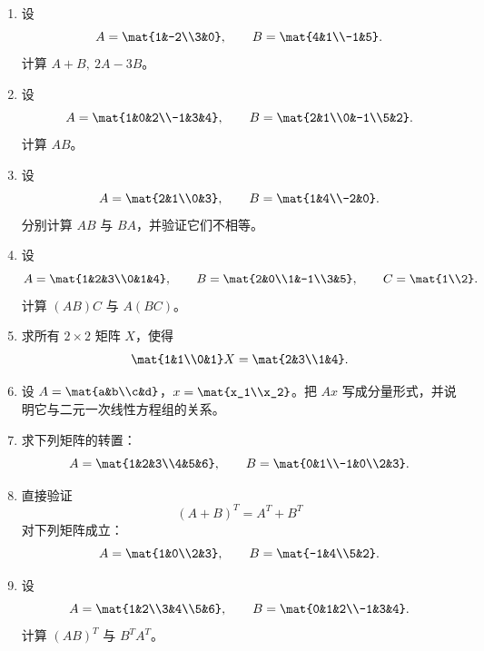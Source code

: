 \begin{enumerate}[label=\arabic*.]
  \item \basic 设
  \[
  A=\mat{1&-2\\3&0},\qquad B=\mat{4&1\\-1&5}.
  \]
  计算 $A+B,\ 2A-3B$。

  \item \basic 设
  \[
  A=\mat{1&0&2\\-1&3&4},\qquad B=\mat{2&1\\0&-1\\5&2}.
  \]
  计算 $AB$。

  \item \basic 设
  \[
  A=\mat{2&1\\0&3},\qquad B=\mat{1&4\\-2&0}.
  \]
  分别计算 $AB$ 与 $BA$，并验证它们不相等。

  \item \basic 设
  \[
  A=\mat{1&2&3\\0&1&4},\qquad B=\mat{2&0\\1&-1\\3&5},\qquad C=\mat{1\\2}.
  \]
  计算 $(AB)C$ 与 $A(BC)$。

  \item \basic 求所有 $2\times2$ 矩阵 $X$，使得
  \[
  \mat{1&1\\0&1}X=\mat{2&3\\1&4}.
  \]

  \item \basic 设 $A=\mat{a&b\\c&d}$，$x=\mat{x_1\\x_2}$。把 $Ax$ 写成分量形式，并说明它与二元一次线性方程组的关系。

  \item \basic 求下列矩阵的转置：
  \[
  A=\mat{1&2&3\\4&5&6},\qquad B=\mat{0&1\\-1&0\\2&3}.
  \]

  \item \basic 直接验证
  \[
  (A+B)^T=A^T+B^T
  \]
  对下列矩阵成立：
  \[
  A=\mat{1&0\\2&3},\qquad B=\mat{-1&4\\5&2}.
  \]

  \item \basic 设
  \[
  A=\mat{1&2\\3&4\\5&6},\qquad B=\mat{0&1&2\\-1&3&4}.
  \]
  计算 $(AB)^T$ 与 $B^TA^T$。


\end{enumerate}
